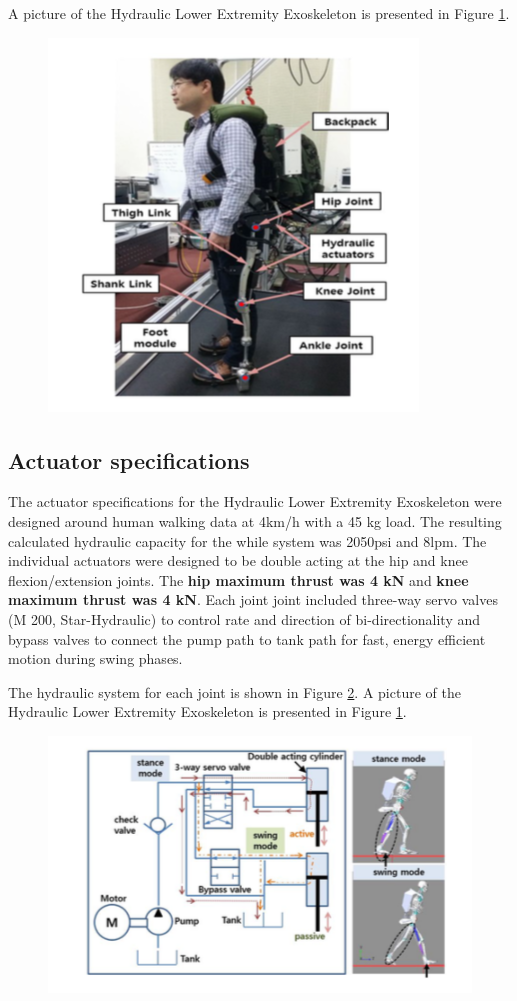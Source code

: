 A picture of the Hydraulic Lower Extremity Exoskeleton is presented in Figure \ref{fig:exoSuit}.
\begin{figure}[thpb]
\centering
\includegraphics[width=3.in]{exos/figs/hydLowerExrem/exoSuit}
  \caption{}
  \vspace{-0.2in}
 \label{fig:exoSuit}   
 \end{figure} 

\subsection{Actuator specifications}

The actuator specifications for the Hydraulic Lower Extremity Exoskeleton were designed around human walking data at 4km/h with a 45 kg load.  The resulting calculated hydraulic capacity for the while system was 2050psi and 8lpm.  The individual actuators were designed to be double acting at the hip and knee flexion/extension joints. The {\bf hip maximum thrust was 4 kN} and {\bf knee maximum thrust was 4 kN}.  Each joint joint included three-way servo valves (M 200, Star-Hydraulic) to control rate and direction of bi-directionality and bypass valves to connect the pump path to tank path for fast, energy efficient motion during swing phases.   

The hydraulic system for each joint is shown in Figure \ref{fig:hydraulicSys}.
A picture of the Hydraulic Lower Extremity Exoskeleton is presented in Figure \ref{fig:exoSuit}.
\begin{figure}[thpb]
\centering
\includegraphics[width=3.in]{exos/figs/hydLowerExrem/hydraulicSys}
  \caption{}
  \vspace{-0.2in}
 \label{fig:hydraulicSys}   
 \end{figure} 


